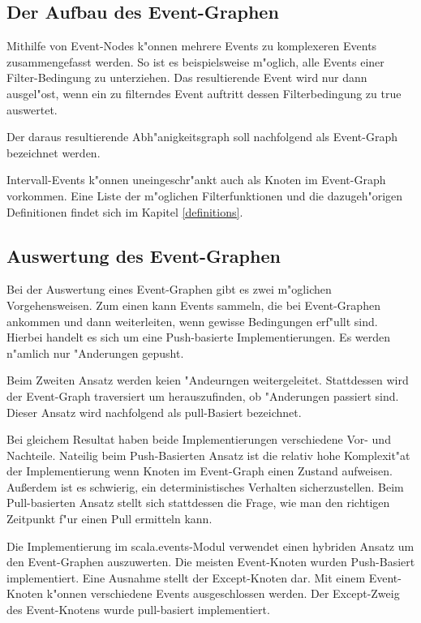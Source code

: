 \subsection{Der Aufbau des Event-Graphen}
Mithilfe von Event-Nodes k"onnen mehrere Events zu komplexeren Events
zusammengefasst werden. So ist es beispielsweise m"oglich, alle Events einer
Filter-Bedingung zu unterziehen. Das resultierende Event wird nur dann
ausgel"ost, wenn ein zu filterndes Event auftritt dessen Filterbedingung zu true
auswertet. 

Der daraus resultierende Abh"anigkeitsgraph soll nachfolgend als Event-Graph
bezeichnet werden.

Intervall-Events k"onnen uneingeschr"ankt auch als Knoten im Event-Graph
vorkommen. Eine Liste der m"oglichen Filterfunktionen und die dazugeh"origen
Definitionen findet sich im Kapitel \ref{definitions}.

\subsection{Auswertung des Event-Graphen}

Bei der Auswertung eines Event-Graphen gibt es zwei m"oglichen Vorgehensweisen.
Zum einen kann Events sammeln, die bei Event-Graphen ankommen und dann
weiterleiten, wenn gewisse Bedingungen erf"ullt sind. Hierbei handelt es sich um
eine Push-basierte Implementierungen. Es werden n"amlich nur "Anderungen gepusht.

Beim Zweiten Ansatz werden keien "Andeurngen weitergeleitet. Stattdessen wird der
Event-Graph traversiert um herauszufinden, ob "Anderungen passiert sind. Dieser
Ansatz wird nachfolgend als pull-Basiert bezeichnet.

Bei gleichem Resultat haben beide Implementierungen verschiedene Vor- und
Nachteile. Nateilig beim Push-Basierten Ansatz ist die relativ hohe Komplexit"at
der Implementierung wenn Knoten im Event-Graph einen Zustand aufweisen.
Au\ss erdem ist es schwierig, ein deterministisches Verhalten sicherzustellen. Beim
Pull-basierten Ansatz stellt sich stattdessen die Frage, wie man den richtigen
Zeitpunkt f"ur einen Pull ermitteln kann. 

Die Implementierung im scala.events-Modul verwendet einen hybriden Ansatz um den
Event-Graphen auszuwerten. Die meisten Event-Knoten wurden Push-Basiert
implementiert. Eine Ausnahme stellt der Except-Knoten dar. Mit einem
Event-Knoten k"onnen verschiedene Events ausgeschlossen werden. Der Except-Zweig
des Event-Knotens wurde pull-basiert implementiert.

